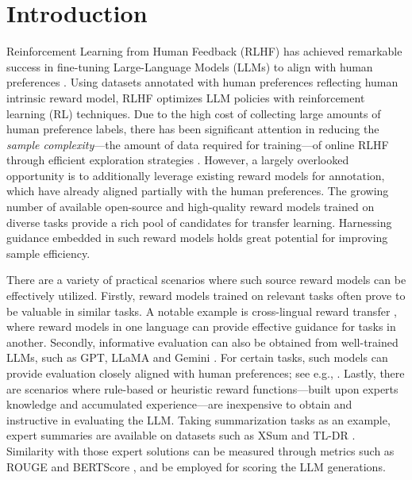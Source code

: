 \section{Introduction}\label{sec:intro}
Reinforcement Learning from Human Feedback (RLHF) has achieved remarkable success in fine-tuning Large-Language Models (LLMs) to align with human preferences \citep{christiano2017deep,bai2022training,ouyang2022training}.
Using datasets annotated with human preferences reflecting human intrinsic reward model, RLHF optimizes LLM policies with reinforcement learning (RL) techniques.
Due to the high cost of collecting large amounts of human preference labels, there has been significant attention in reducing the \emph{sample complexity}---the amount of data required for training---of online RLHF through efficient exploration strategies \citep{wang2023rlhf,xie2024exploratory,cen2024value,zhang2024self}.
However, a largely overlooked opportunity is to additionally leverage existing reward models for annotation, which have already aligned partially with the human preferences.
The growing number of available open-source and high-quality reward models trained on diverse tasks provide a rich pool of candidates for transfer learning.
Harnessing guidance embedded in such reward models holds great potential for improving sample efficiency.
%
%
%
%

There are a variety of practical scenarios where such source reward models can be effectively utilized.
%
Firstly, reward models trained on relevant tasks often prove to be valuable in similar tasks.
A notable example is cross-lingual reward transfer \citep{wu2024reuse, hong2024cross}, where reward models in one language can provide effective guidance for tasks in another.
%
Secondly, informative evaluation can also be obtained from well-trained LLMs, such as GPT, LLaMA and Gemini \citep{achiam2023gpt,dubey2024llama,team2024gemini}. For certain tasks, such models can provide evaluation closely aligned with human preferences; see e.g., \citet{lee2023rlaif,ji2023ai}.
Lastly, there are scenarios where rule-based or heuristic reward functions---built upon experts knowledge and accumulated experience---are inexpensive to obtain and instructive in evaluating the LLM.
Taking summarization tasks as an example, expert summaries are available on datasets such as XSum \citep{Narayan2018DontGM} and TL-DR \citep{volske-etal-2017-tl}. Similarity with those expert solutions can be measured through metrics such as ROUGE \citep{lin2004rouge} and BERTScore \citep{zhang2019bertscore}, and be employed for scoring the LLM generations.
%
%
%

